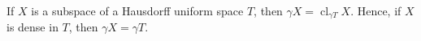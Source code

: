 If $X$ is a subspace of a Hausdorff uniform space $T$, then $\gamma X = \operatorname{cl}_{\gamma T} X$. Hence, if $X$ is dense in $T$, then $\gamma X = \gamma T$.
